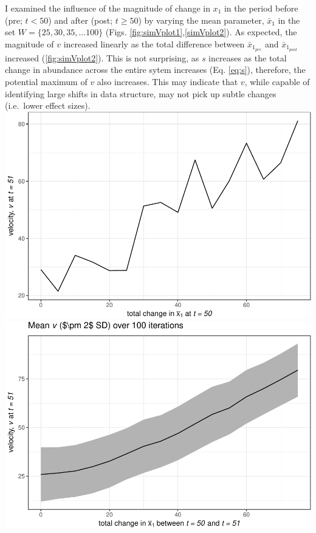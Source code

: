 \documentclass[12pt,twoside,openany]{reedthesis}
\begin{document}
I examined the influence of the magnitude of change in \(x_1\) in the period before (pre; \(t <50\)) and after (post; \(t \geq 50\)) by varying the mean parameter, \(\bar{x}_1\) in the set \(W=\{25,30,35,...100 \}\) (Figs. \ref{fig:simVplot1},\ref{simVplot2}). As expected, the magnitude of \(v\) increased linearly as the total difference between \(\bar{x}_{1_{pre}}\) and \(\bar{x}_{1_{post}}\) increased (\ref{fig:simVplot2}). This is not surprising, as \(s\) increases as the total change in abundance across the entire sytem increases (Eq. \eqref{eq:s}), therefore, the potential maximum of \(v\) also increases. This may indicate that \(v\), while capable of identifying large shifts in data structure, may not pick up subtle changes (i.e.~lower effect sizes).
\includegraphics{_myDissertation_files/figure-latex/simVplot1-1.pdf}
\includegraphics{_myDissertation_files/figure-latex/simVplot2-1.pdf}
\end{document}
